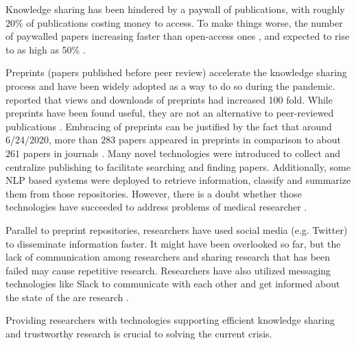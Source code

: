 \documentclass[acmsmall,authordraft]{acmart}
\begin{document}
 
 Knowledge sharing has been hindered by a paywall of publications, with roughly $20\%$ of publications costing money to access. To make things worse, the number of paywalled papers increasing faster than open-access ones \citep{torres2020open}, and expected to rise to as high as $50\%$ \citep{Brainard2020drowning}.
 
Preprints (papers published before peer review) accelerate the knowledge sharing process \citep{johansson2018preprints} and have been widely adopted as a way to do so during the pandemic. \citet{glasziou2020waste} reported that views and downloads of preprints had increased 100 fold. While preprints have been found useful, they are not an alternative to peer-reviewed publications \citep{langham2019discovery}. Embracing of preprints can be justified by the fact that around 6/24/2020, more than $283$ papers appeared in preprints in comparison to about $261$ papers in journals \citep{Kupferschmidt2020culture}. Many novel technologies were introduced to collect and centralize publishing to facilitate searching and finding papers. Additionally, some NLP based systems were deployed to retrieve information, classify and summarize them from those repositories. However, there is a doubt whether those technologies have succeeded to address problems of medical researcher \citep{resnik2020developing}.

Parallel to preprint repositories, researchers have used social media (e.g. Twitter) to disseminate information faster. 
It might have been overlooked so far, but the lack of communication among researchers and sharing research that has been failed may cause repetitive research. Researchers have also utilized messaging technologies like Slack to communicate with each other and get informed about the state of the are research \citep{Kupferschmidt2020culture}.
 
Providing researchers with technologies supporting efficient knowledge sharing and trustworthy research is crucial to solving the current crisis. 
\end{document}
